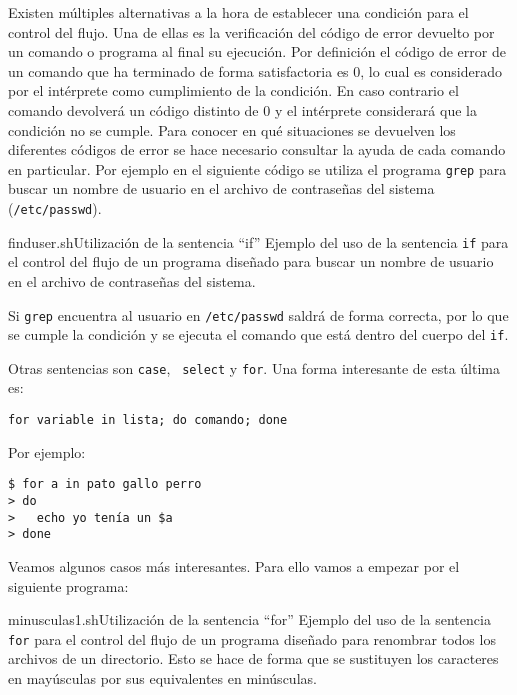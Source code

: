 Existen múltiples alternativas a la hora de establecer una condición
para el control del flujo. Una de ellas es la verificación del código
de error devuelto por un comando o programa al final su ejecución. Por
definición el código de error de un comando que ha terminado de forma
satisfactoria es 0, lo cual es considerado por el intérprete como
cumplimiento de la condición. En caso contrario el comando devolverá
un código distinto de 0 y el intérprete considerará que la condición
no se cumple. Para conocer en qué situaciones se devuelven los
diferentes códigos de error se hace necesario consultar la ayuda de
cada comando en particular. Por ejemplo en el siguiente código se
utiliza el programa {\tt grep} para buscar un nombre de
usuario en el archivo de contraseñas del sistema ({\tt /etc/passwd}).

\begin{ejemplo}{finduser.sh}{Utilización de la sentencia ``if''}
Ejemplo del uso de la sentencia {\tt if} para el control del flujo de
un programa diseñado para buscar un nombre de usuario en el archivo de
contraseñas del sistema.
\end{ejemplo}

Si  {\tt grep}  encuentra al  usuario en  {\tt /etc/passwd}  saldrá de
forma correcta,  por lo  que se  cumple la condición  y se  ejecuta el
comando que está dentro del cuerpo del {\tt if}.

Otras     sentencias     son      {\tt     case},     {\tt
select} y {\tt for}. Una forma interesante de
esta última es:

{\tt for variable in lista; do comando; done}

Por ejemplo:

\begin{verbatim}
$ for a in pato gallo perro
> do
>   echo yo tenía un $a
> done
\end{verbatim}

Veamos algunos casos  más interesantes. Para ello vamos  a empezar por
el siguiente programa:

\begin{ejemplo}{minusculas1.sh}{Utilización de la sentencia ``for''}
Ejemplo del uso de la sentencia {\tt for} para el control del flujo de
un programa diseñado para renombrar todos los archivos de un
directorio. Esto se hace de forma que se sustituyen los caracteres en
mayúsculas por sus equivalentes en minúsculas.
\end{ejemplo}

